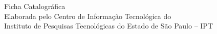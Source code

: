 {
\centering
\vspace*{\fill}

Ficha  Catalográfica\\
Elaborada pelo Centro de Informação Tecnológica do\\
Instituto de Pesquisas Tecnológicas do Estado de São Paulo – IPT\\
\vspace{0.5\baselineskip}
\hfill{
}\hfill
\vspace{2\baselineskip}
}
\pagebreak
